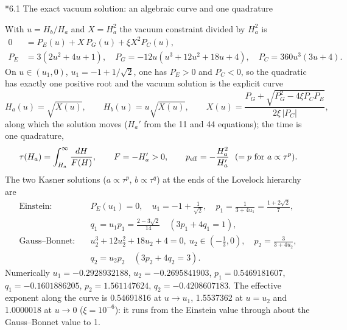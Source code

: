 \documentclass[10pt,a4paper]{article}
\makeatletter
\renewcommand\subsection{\@startsection{subsection}{2}{\z@}{-3.25ex\@plus -1ex \@minus -.2ex}{1.5ex \@plus .2ex}{\normalfont\large\bfseries\raggedright}}
\makeatother
\begin{document}
\subsection*{6.1 The exact vacuum solution: an algebraic curve and one quadrature}
With $u=H_b/H_a$ and $X=H_a^2$ the vacuum constraint divided by $H_a^2$ is
\begin{align*}
0&=P_E(u)+X\,P_G(u)+\xi X^2P_C(u), \\
P_E&=3(2u^2+4u+1),\quad P_G=-12u(u^3+12u^2+18u+4),\quad P_C=360u^3(3u+4).
\end{align*}
On $u\in(u_1,0)$, $u_1=-1+1/\sqrt2$, one has $P_E>0$ and $P_C<0$, so the quadratic has exactly one positive root and the vacuum solution is the explicit curve
\begin{equation*}
H_a(u)=\sqrt{X(u)},\qquad H_b(u)=u\sqrt{X(u)},\qquad X(u)=\frac{P_G+\sqrt{P_G^2-4\xi P_CP_E}}{2\xi\,|P_C|},
\end{equation*}
along which the solution moves ($H_a'$ from the 11 and 44 equations); the time is one quadrature,
\begin{equation*}
\tau(H_a)=\int_{H_a}^{\infty}\frac{dH}{F(H)},\qquad F=-H_a'>0,\qquad p_{\rm eff}=-\frac{H_a^2}{H_a'}\ \ (=p\ \text{for}\ a\propto\tau^p).
\end{equation*}
The two Kasner solutions ($a\propto\tau^p$, $b\propto\tau^q$) at the ends of the Lovelock hierarchy are
\begin{align*}
\text{Einstein:}\quad &P_E(u_1)=0,\quad u_1=-1+\tfrac1{\sqrt2},\quad p_1=\frac1{3+4u_1}=\frac{1+2\sqrt2}7, \\
&q_1=u_1p_1=\frac{2-3\sqrt2}{14}\quad(3p_1+4q_1=1), \\
\text{Gauss–Bonnet:}\quad &u_2^3+12u_2^2+18u_2+4=0,\ u_2\in(-\tfrac13,0),\quad p_2=\frac3{3+4u_2}, \\
&q_2=u_2p_2\quad(3p_2+4q_2=3).
\end{align*}
Numerically $u_1=-0.2928932188$, $u_2=-0.2695841903$, $p_1=0.5469181607$, $q_1=-0.1601886205$, $p_2=1.561147624$, $q_2=-0.4208607183$. The effective exponent along the curve is 0.54691816 at $u\to u_1$, 1.5537362 at $u=u_2$ and 1.0000018 at $u\to0$ ($\xi=10^{-6}$): it runs from the Einstein value through about the Gauss–Bonnet value to 1.
\end{document}

